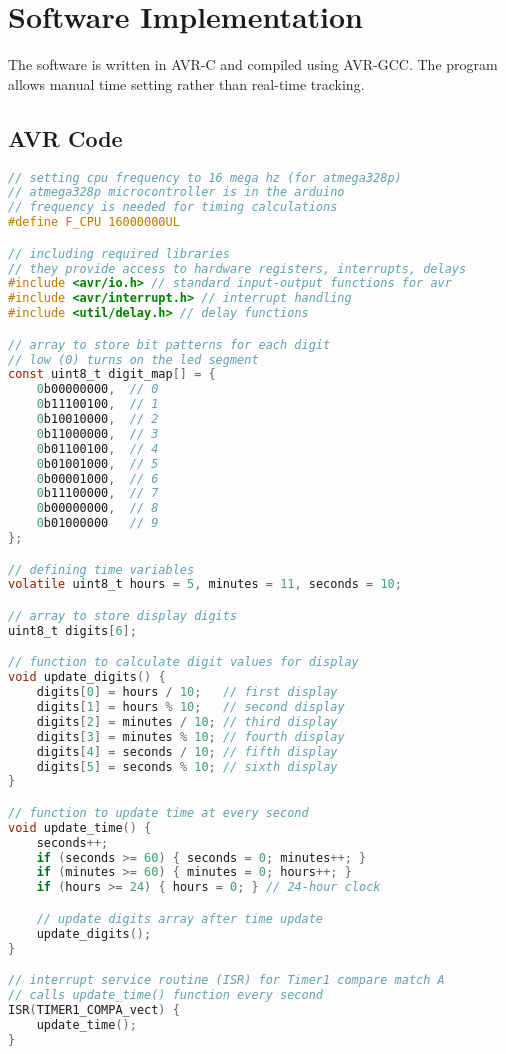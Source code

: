 \documentclass[12pt,a4paper]{article}
\begin{document}
\section{Software Implementation}
The software is written in AVR-C and compiled using AVR-GCC. The program allows manual time setting rather than real-time tracking.

\subsection{AVR Code}
\begin{lstlisting}[language=C, basicstyle=\ttfamily, keywordstyle=\color{blue}, commentstyle=\color{green}]
// setting cpu frequency to 16 mega hz (for atmega328p)
// atmega328p microcontroller is in the arduino
// frequency is needed for timing calculations
#define F_CPU 16000000UL

// including required libraries
// they provide access to hardware registers, interrupts, delays
#include <avr/io.h> // standard input-output functions for avr
#include <avr/interrupt.h> // interrupt handling
#include <util/delay.h> // delay functions

// array to store bit patterns for each digit
// low (0) turns on the led segment
const uint8_t digit_map[] = {
    0b00000000,  // 0
    0b11100100,  // 1
    0b10010000,  // 2
    0b11000000,  // 3
    0b01100100,  // 4
    0b01001000,  // 5
    0b00001000,  // 6
    0b11100000,  // 7
    0b00000000,  // 8
    0b01000000   // 9
};

// defining time variables
volatile uint8_t hours = 5, minutes = 11, seconds = 10;

// array to store display digits
uint8_t digits[6];

// function to calculate digit values for display
void update_digits() {
    digits[0] = hours / 10;   // first display
    digits[1] = hours % 10;   // second display
    digits[2] = minutes / 10; // third display
    digits[3] = minutes % 10; // fourth display
    digits[4] = seconds / 10; // fifth display
    digits[5] = seconds % 10; // sixth display
}

// function to update time at every second
void update_time() {
    seconds++;
    if (seconds >= 60) { seconds = 0; minutes++; }
    if (minutes >= 60) { minutes = 0; hours++; }
    if (hours >= 24) { hours = 0; } // 24-hour clock

    // update digits array after time update
    update_digits();
}

// interrupt service routine (ISR) for Timer1 compare match A
// calls update_time() function every second
ISR(TIMER1_COMPA_vect) {
    update_time();
}


\end{lstlisting}
\end{document}
